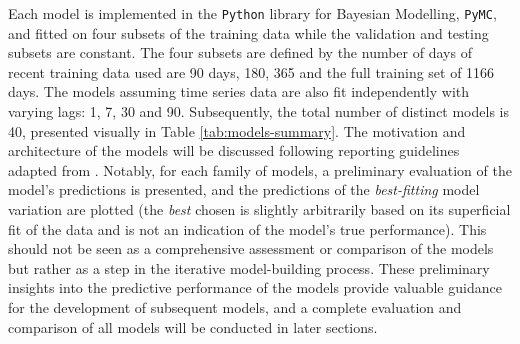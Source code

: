 Each model is implemented in the \texttt{Python} library for Bayesian
Modelling, \texttt{PyMC}, and fitted on four subsets of the training data while
the validation and testing subsets are constant. The four subsets are defined
by the number of days of recent training data used are 90 days, 180, 365 and
the full training set of 1166 days. The models assuming time series data are
also fit independently with varying lags: 1, 7, 30 and 90.
Subsequently, the total number of distinct models is 40, presented visually in
Table \ref{tab:models-summary}. The motivation and architecture of the models
will be discussed following reporting guidelines adapted from \cite{clinical}.
Notably, for each family of models, a preliminary evaluation of the model's
predictions is presented, and the predictions of the \textit{best-fitting}
model variation are plotted (the \textit{best} chosen is slightly arbitrarily
based on its superficial fit of the data and is not an indication of the
model's true performance). This should not be seen as a comprehensive
assessment or comparison of the models but rather as a step in the iterative
model-building process. These preliminary insights into the predictive
performance of the models provide valuable guidance for the development of
subsequent models, and a complete evaluation and comparison of all models will be
conducted in later sections.

